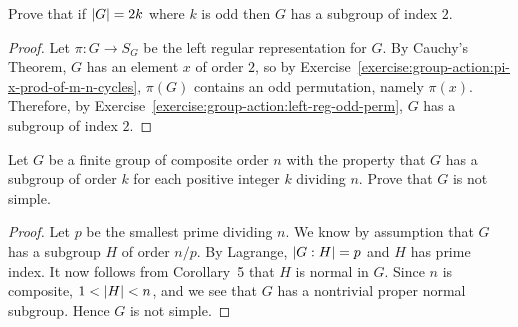  Prove that if $\lvert{G}\rvert = 2k$ where $k$ is odd then $G$
has a subgroup of index $2$.
\begin{proof}
  Let $\pi\colon G\to S_G$ be the left regular representation for
  $G$. By Cauchy's Theorem, $G$ has an element $x$ of order $2$, so by
  Exercise~\ref{exercise:group-action:pi-x-prod-of-m-n-cycles},
  $\pi(G)$ contains an odd permutation, namely $\pi(x)$. Therefore, by
  Exercise~\ref{exercise:group-action:left-reg-odd-perm}, $G$ has a
  subgroup of index $2$.
\end{proof}

 Let $G$ be a finite group of composite order $n$ with
the property that $G$ has a subgroup of order $k$ for each positive
integer $k$ dividing $n$. Prove that $G$ is not simple.
\begin{proof}
  Let $p$ be the smallest prime dividing $n$. We know by assumption
  that $G$ has a subgroup $H$ of order $n/p$. By Lagrange,
  $\lvert{G:H}\rvert = p$ and $H$ has prime index. It now follows from
  Corollary~5 that $H$ is normal in $G$. Since $n$ is composite,
  $1 < \lvert{H}\rvert < n$, and we see that $G$ has a nontrivial proper
  normal subgroup. Hence $G$ is not simple.
\end{proof}
